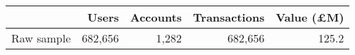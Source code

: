 \begin{tabular}{lrrrr}
\toprule
           &   Users & Accounts & Transactions & Value (\pounds M) \\
\midrule
Raw sample & 682,656 &    1,282 &      682,656 &             125.2 \\
\bottomrule
\end{tabular}

